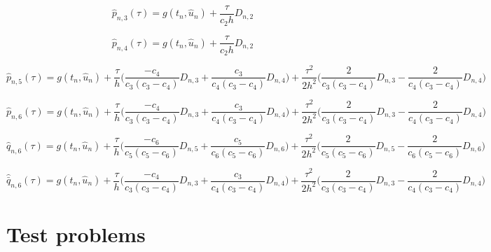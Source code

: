 \documentclass[12pt]{article}
\begin{document}
\begin{equation}
\hat{p}_{n,3}(\tau) = g(t_n,\hat{u}_n) + \frac{\tau}{c_2h}D_{n,2}
\end{equation}

\begin{equation}
\hat{p}_{n,4}(\tau) = g(t_n,\hat{u}_n) + \frac{\tau}{c_2h}D_{n,2}
\end{equation}

\begin{equation}
\hat{p}_{n,5}(\tau) = g(t_n,\hat{u}_n) + \frac{\tau}{h}\Bigg(\frac{-c_4}{c_3(c_3 - c_4)}D_{n,3} + \frac{c_3}{c_4(c_3 - c_4)}D_{n,4} \Bigg) + \frac{\tau^2}{2h^2}\Bigg(\frac{2}{c_3(c_3-c_4)}D_{n,3} - \frac{2}{c_4(c_3 - c_4)}D_{n,4} \Bigg)
\end{equation}

\begin{equation}
\hat{p}_{n,6}(\tau) = g(t_n,\hat{u}_n) + \frac{\tau}{h}\Bigg(\frac{-c_4}{c_3(c_3 - c_4)}D_{n,3} + \frac{c_3}{c_4(c_3 - c_4)}D_{n,4} \Bigg) + \frac{\tau^2}{2h^2}\Bigg(\frac{2}{c_3(c_3-c_4)}D_{n,3} - \frac{2}{c_4(c_3 - c_4)}D_{n,4} \Bigg)
\end{equation}

\begin{equation}
\hat{q}_{n,6}(\tau) = g(t_n,\hat{u}_n) + \frac{\tau}{h}\Bigg(\frac{-c_6}{c_5(c_5 - c_6)}D_{n,5} + \frac{c_5}{c_6(c_5 - c_6)}D_{n,6} \Bigg) + \frac{\tau^2}{2h^2}\Bigg(\frac{2}{c_5(c_5-c_6)}D_{n,5} - \frac{2}{c_6(c_5 - c_6)}D_{n,6} \Bigg)
\end{equation}

\begin{equation}
\hat{\bar{q}}_{n,6}(\tau) = g(t_n,\hat{u}_n) + \frac{\tau}{h}\Bigg(\frac{-c_4}{c_3(c_3 - c_4)}D_{n,3} + \frac{c_3}{c_4(c_3 - c_4)}D_{n,4} \Bigg) + \frac{\tau^2}{2h^2}\Bigg(\frac{2}{c_3(c_3-c_4)}D_{n,3} - \frac{2}{c_4(c_3 - c_4)}D_{n,4} \Bigg)
\end{equation}

\section{Test problems}
\end{document}
